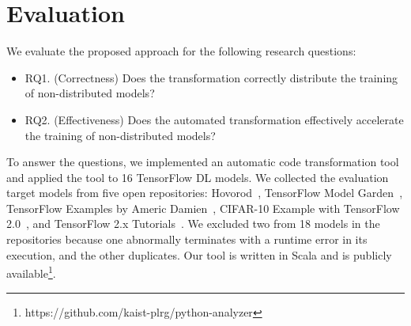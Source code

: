 \section{Evaluation}\label{sec:eval}
We evaluate the proposed approach for the following research questions:
\begin{itemize}
\item RQ1. (Correctness) Does the transformation correctly distribute the
  training of non-distributed models?
\item RQ2. (Effectiveness) Does the automated transformation effectively
  accelerate the training of non-distributed models?
\end{itemize}

\noindent
To answer the questions, we implemented an automatic code transformation tool
and applied the tool to 16 TensorFlow DL models.
We collected the evaluation target models from five open repositories: 
Hovorod~\cite{horovodgithub}, TensorFlow Model Garden~\cite{tfmodelgarden},
TensorFlow Examples by Americ Damien~\cite{tfexamplesdamien},
CIFAR-10 Example with TensorFlow 2.0~\cite{cifar10github}, and
TensorFlow 2.x Tutorials~\cite{tf2tutogithub}.
We excluded two from 18 models in the repositories because one abnormally
terminates with a runtime error in its execution, and the other duplicates.
Our tool is written in Scala and is publicly
available\footnote{https://github.com/kaist-plrg/python-analyzer}.

